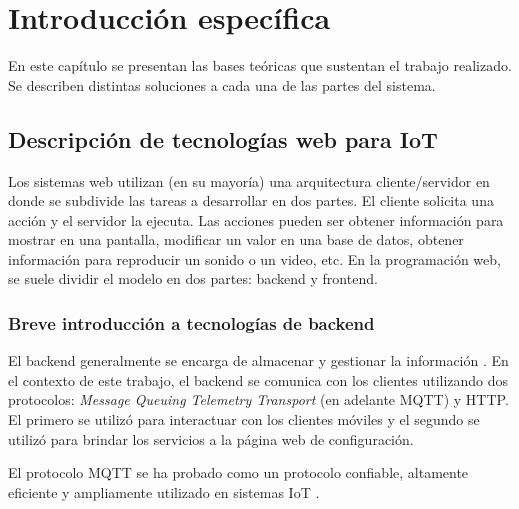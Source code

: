 \chapter{Introducción específica} %

\label{Chapter2}

En este capítulo se presentan las bases teóricas que sustentan el trabajo realizado. Se describen distintas soluciones a cada una de las partes del sistema.

\section{Descripción de tecnologías web para IoT}
\label{sec:Descripción de tecnologías web para IoT}


Los sistemas web utilizan (en su mayoría) una arquitectura cliente/servidor en donde se subdivide las tareas a desarrollar en dos partes. El cliente solicita una acción y el servidor la ejecuta. Las acciones pueden ser obtener información para mostrar en una pantalla, modificar un valor en una base de datos, obtener información para reproducir un sonido o un video, etc. En la programación web, se suele dividir el modelo en dos partes: backend y frontend.  

\subsection{ Breve introducción a tecnologías de backend}
El backend  generalmente se encarga de almacenar y gestionar la información \citep{ARTICLE:4}. En el contexto de este trabajo, el backend se comunica con los clientes utilizando dos protocolos: \textit{Message Queuing Telemetry Transport} (en adelante MQTT)  y HTTP. El primero se utilizó para interactuar con los clientes móviles y el segundo se utilizó para brindar los servicios a la página web de configuración.

El protocolo MQTT \citep{ WEBSITE:5} se ha probado como un protocolo confiable, altamente eficiente y ampliamente utilizado en sistemas IoT \citep{ARTICLE:2}.

